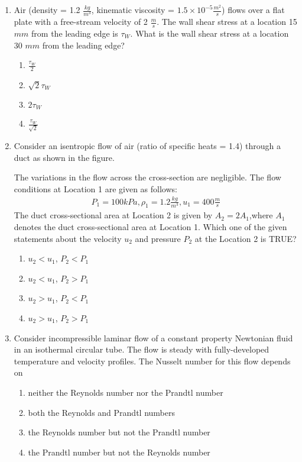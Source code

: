 \documentclass[journal]{IEEEtran}
\numberwithin{equation}{enumi}
\numberwithin{figure}{enumi}
\begin{document}
\begin{enumerate}
    \item 
    Air (density = 1.2 $\frac{kg}{m^3}$, kinematic viscosity = $1.5 \times 10^{-5}\frac{m^2}{s}$) flows over a flat plate with a free-stream velocity of 2 $\frac{m}{s}$. The wall shear stress at a location 15 $mm$ from the leading edge is $\tau_W$. What is the wall shear stress at a location 30 $mm$ from the leading edge?
    \begin{enumerate}
        \item $\frac{\tau_W}{2}$
        \item $\sqrt{2}\tau_W$
        \item $2\tau_W$
        \item $\frac{\tau_W}{\sqrt{2}}$
    \end{enumerate}

    \item 
    Consider an isentropic flow of air (ratio of specific heats = 1.4) through a duct as shown in the figure.

    The variations in the flow across the cross-section are negligible. The flow conditions at Location 1 are given as follows:
    \begin{align*}
        P_1 = 100kPa, \rho_1 = 1.2 \frac{kg}{m^3}, u_1 = 400\frac{m}{s}
    \end{align*}
    The duct cross-sectional area at Location 2 is given by $A_2 = 2A_1$,where $A_1$ denotes the duct cross-sectional area at Location 1. Which one of the given statements about the velocity $u_2$ and pressure $P_2$ at the Location 2 is TRUE?


    \begin{enumerate}
        \item $u_2 < u_1$, $P_2 < P_1$
        \item $u_2 < u_1$, $P_2 > P_1$
        \item $u_2 > u_1$, $P_2 < P_1$
        \item $u_2 > u_1$, $P_2 > P_1$
    \end{enumerate}

    \item 
    Consider incompressible laminar flow of a constant property Newtonian fluid in an isothermal circular tube. The flow is steady with fully-developed temperature and velocity profiles. The Nusselt number for this flow depends on
    \begin{enumerate}
        \item neither the Reynolds number nor the Prandtl number
        \item both the Reynolds and Prandtl numbers
        \item the Reynolds number but not the Prandtl number
        \item the Prandtl number but not the Reynolds number
    \end{enumerate}


\end{enumerate}
\end{document}
